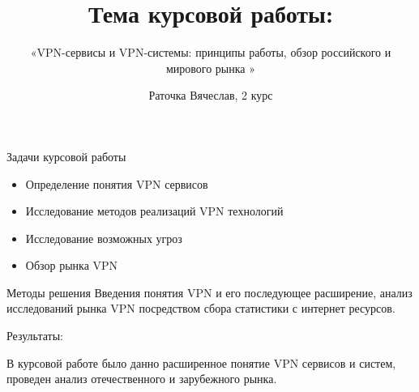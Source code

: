 \documentclass[11pt]{beamer}
\title{Тема курсовой работы:}
\subtitle{«VPN-сервисы и VPN-системы: принципы работы, обзор российского и мирового рынка »}
\author{Раточка Вячеслав, 2 курс}
\institute{Балтийский федеральный университет имени Иммануила Канта}
\begin{document}
	
	\begin{frame}
		\titlepage
	\end{frame}
		\begin{frame}
		\begin{block}{Задачи курсовой работы}
			\begin{itemize}
				\item Определение понятия VPN сервисов
				\item Исследование методов реализаций VPN технологий
				\item Исследование возможных угроз
				\item Обзор рынка VPN 
				\end{itemize}
		\end{block}
		\begin{block}{Методы решения}
				Введения понятия VPN и его последующее расширение, анализ исследований рынка VPN посредством сбора статистики с интернет ресурсов.
						\end{block}
	\end{frame}
	\begin{frame}
Результаты:
			
				В курсовой работе было данно расширенное понятие VPN сервисов и систем, проведен анализ отечественного и зарубежного рынка. 

\end{frame}	
\end{document}
